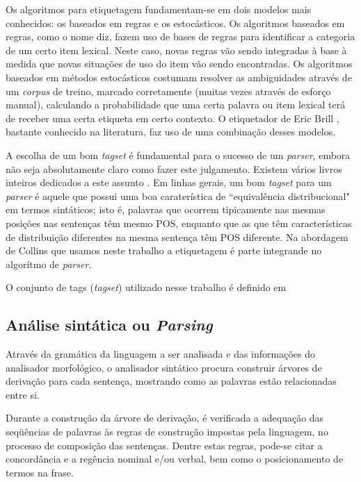 Os algoritmos para etiquetagem fundamentam-se em dois modelos mais conhecidos: os baseados em regras e os estocásticos. Os algoritmos baseados em regras, como o nome diz, fazem uso de bases de regras para identificar a categoria de um certo item lexical. Neste caso, novas regras vão sendo integradas à base à medida que novas situações de uso do item vão sendo encontradas. Os algoritmos baseados em métodos estocásticos costumam resolver as ambiguidades através de um \emph{corpus} de treino, marcado corretamente (muitas vezes através de esforço manual), calculando a probabilidade que uma certa palavra ou item lexical terá de receber uma certa etiqueta em certo contexto. O etiquetador de Eric Brill \cite{brill95}, bastante conhecido na literatura, faz uso de uma combinação desses modelos.

A escolha de um bom \emph{tagset} é fundamental para o sucesso de um \emph{parser}, embora não seja absolutamente claro como fazer este julgamento. Existem vários livros inteiros dedicados a este assunto \cite{abeille03} \cite{sardinha04}. Em linhas gerais, um bom \emph{tagset} para um \emph{parser} é aquele que possui uma boa caraterística de ``equivalência distribucional" em termos sintáticos; isto é, palavras que ocorrem tipicamente nas mesmas posições nas sentenças têm mesmo POS, enquanto que as que têm características de distribuição diferentes na mesma sentença têm POS diferente. Na abordagem de Collins \cite{collins99} que usamos neste trabalho a etiquetagem é parte integrande no algorítmo de \emph{parser}.

O conjunto de tags (\emph{tagset}) utilizado nesse trabalho é definido em \cite{florestasintatica}

\subsection{Análise sintática ou \emph{Parsing}} %
\label{sub:analise_sintatica_ou_parsing}

Através da gramática da linguagem a ser analisada e das informações do analisador morfológico, o analisador sintático procura construir árvores de derivação para cada sentença, mostrando como as palavras estão relacionadas entre si.

Durante a construção da árvore de derivação, é verificada a adequação das seqüências de palavras às regras de construção impostas pela linguagem, no processo de composição das sentenças. Dentre estas regras, pode-se citar a concordância e a regência nominal e/ou verbal, bem como o posicionamento de termos na frase.

